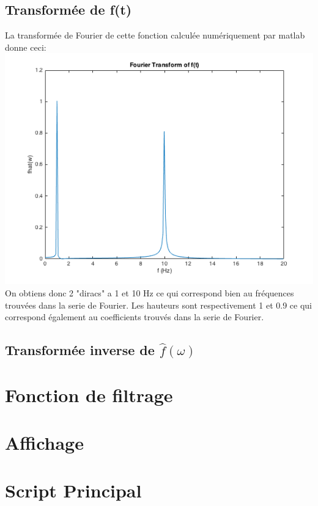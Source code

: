 \documentclass[a4paper,11pt]{article}
\begin{document}
\subsection{Transformée de f(t)}
La transformée de Fourier de cette fonction calculée numériquement par matlab donne ceci: \newline
\includegraphics[scale=0.6]{"fhat.png"} \newline
On obtiens donc 2 "diracs" a 1 et 10 Hz ce qui correspond bien au fréquences trouvées dans la serie de Fourier. Les hauteurs sont respectivement 1 et 0.9 ce qui correspond également au coefficients trouvés dans la serie de Fourier.

\subsection{Transformée inverse de $\hat{f}(\omega)$}


\section{Fonction de filtrage}

\section{Affichage}

\section{Script Principal}
\end{document}
